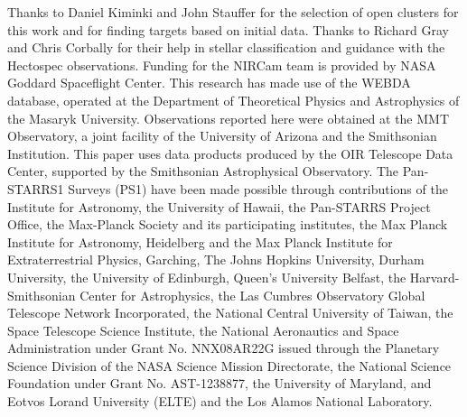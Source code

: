 \documentclass{aastex6}
\begin{document}
Thanks to Daniel Kiminki and John Stauffer for the selection of open clusters for this work and for finding targets based on initial data.
Thanks to Richard Gray and Chris Corbally for their help in stellar classification and guidance with the Hectospec observations.
Funding for the NIRCam team is provided by NASA Goddard Spaceflight Center. This research has made use of the WEBDA database, operated at the Department of Theoretical Physics and Astrophysics of the Masaryk University.
Observations reported here were obtained at the MMT Observatory, a joint facility of the University of Arizona and the Smithsonian Institution.
This paper uses data products produced by the OIR Telescope Data Center, supported by the Smithsonian Astrophysical Observatory.
The Pan-STARRS1 Surveys (PS1) have been made possible through contributions of the Institute for Astronomy, the University of Hawaii, the Pan-STARRS Project Office, the Max-Planck Society and its participating institutes, the Max Planck Institute for Astronomy, Heidelberg and the Max Planck Institute for Extraterrestrial Physics, Garching, The Johns Hopkins University, Durham University, the University of Edinburgh, Queen's University Belfast, the Harvard-Smithsonian Center for Astrophysics, the Las Cumbres Observatory Global Telescope Network Incorporated, the National Central University of Taiwan, the Space Telescope Science Institute, the National Aeronautics and Space Administration under Grant No. NNX08AR22G issued through the Planetary Science Division of the NASA Science Mission Directorate, the National Science Foundation under Grant No. AST-1238877, the University of Maryland, and Eotvos Lorand University (ELTE) and the Los Alamos National Laboratory. 


\end{document}
